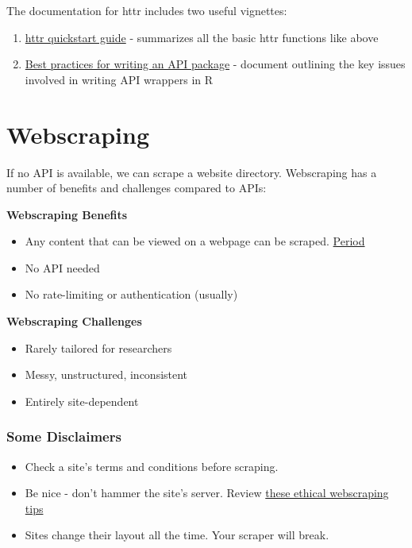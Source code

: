 \documentclass[]{book}
\providecommand{\tightlist}{%
  \setlength{\itemsep}{0pt}\setlength{\parskip}{0pt}}
\begin{document}
The documentation for httr includes two useful vignettes:

\begin{enumerate}
\def\labelenumi{\arabic{enumi}.}
\tightlist
\item
  \href{https://cran.r-project.org/web/packages/httr/vignettes/quickstart.html}{httr quickstart guide} - summarizes all the basic httr functions like above
\item
  \href{https://cran.r-project.org/web/packages/httr/vignettes/api-packages.html}{Best practices for writing an API package} - document outlining the key issues involved in writing API wrappers in R
\end{enumerate}

\hypertarget{webscraping}{%
\section{Webscraping}\label{webscraping}}

If no API is available, we can scrape a website directory. Webscraping has a number of benefits and challenges compared to APIs:

\textbf{Webscraping Benefits}

\begin{itemize}
\tightlist
\item
  Any content that can be viewed on a webpage can be scraped. \href{https://blog.hartleybrody.com/web-scraping/}{Period}
\item
  No API needed
\item
  No rate-limiting or authentication (usually)
\end{itemize}

\textbf{Webscraping Challenges}

\begin{itemize}
\tightlist
\item
  Rarely tailored for researchers
\item
  Messy, unstructured, inconsistent
\item
  Entirely site-dependent
\end{itemize}

\hypertarget{some-disclaimers}{%
\subsubsection*{Some Disclaimers}\label{some-disclaimers}}

\begin{itemize}
\tightlist
\item
  Check a site's terms and conditions before scraping.
\item
  Be nice - don't hammer the site's server. Review \href{https://towardsdatascience.com/ethics-in-web-scraping-b96b18136f01}{these ethical webscraping tips}
\item
  Sites change their layout all the time. Your scraper will break.
\end{itemize}
\end{document}
